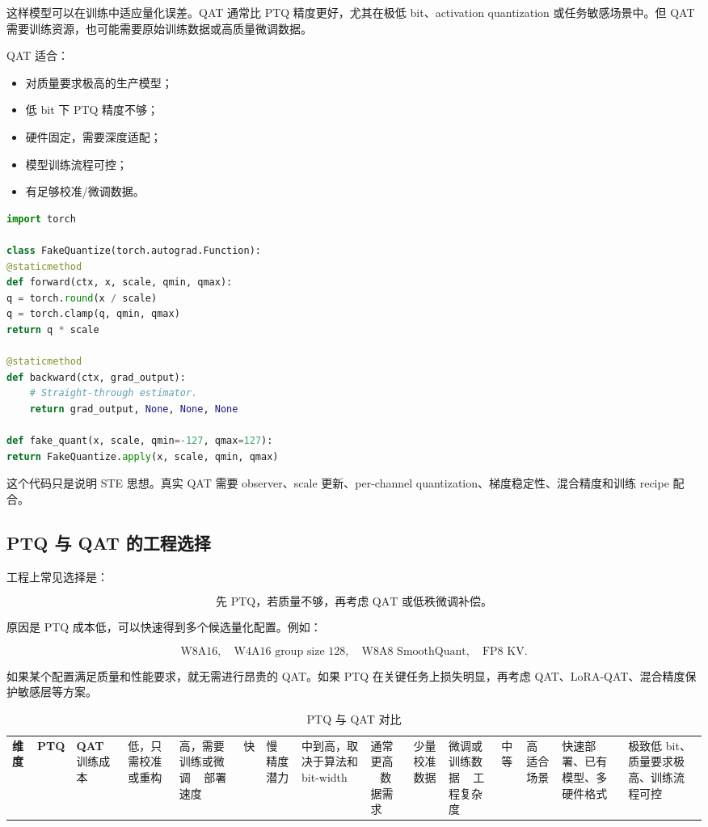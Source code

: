 这样模型可以在训练中适应量化误差。QAT 通常比 PTQ 精度更好，尤其在极低 bit、activation quantization 或任务敏感场景中。但 QAT 需要训练资源，也可能需要原始训练数据或高质量微调数据。

QAT 适合：

\begin{itemize}
\item 对质量要求极高的生产模型；
\item 低 bit 下 PTQ 精度不够；
\item 硬件固定，需要深度适配；
\item 模型训练流程可控；
\item 有足够校准/微调数据。
\end{itemize}

\begin{lstlisting}[language=Python,caption={Fake Quantization 的简化 PyTorch 实现},label={lst:fake-quantization-pytorch}]
import torch

class FakeQuantize(torch.autograd.Function):
@staticmethod
def forward(ctx, x, scale, qmin, qmax):
q = torch.round(x / scale)
q = torch.clamp(q, qmin, qmax)
return q * scale

@staticmethod
def backward(ctx, grad_output):
    # Straight-through estimator.
    return grad_output, None, None, None

def fake_quant(x, scale, qmin=-127, qmax=127):
return FakeQuantize.apply(x, scale, qmin, qmax)
\end{lstlisting}

这个代码只是说明 STE 思想。真实 QAT 需要 observer、scale 更新、per-channel quantization、梯度稳定性、混合精度和训练 recipe 配合。

\subsection{PTQ 与 QAT 的工程选择}
\label{subsec:ptq-vs-qat-engineering-choice}

工程上常见选择是：

\[
\text{先 PTQ，若质量不够，再考虑 QAT 或低秩微调补偿。}
\]

原因是 PTQ 成本低，可以快速得到多个候选量化配置。例如：

\[
\text{W8A16},\quad
\text{W4A16 group size 128},\quad
\text{W8A8 SmoothQuant},\quad
\text{FP8 KV}.
\]

如果某个配置满足质量和性能要求，就无需进行昂贵的 QAT。如果 PTQ 在关键任务上损失明显，再考虑 QAT、LoRA-QAT、混合精度保护敏感层等方案。

\begin{table}[H]
\centering
\small
\caption{PTQ 与 QAT 对比}
\label{tab:ptq-vs-qat}
\begin{tabular}{p{}p{}p{}}
\toprule
\textbf{维度} & \textbf{PTQ} & \textbf{QAT} \
\midrule
训练成本
& 低，只需校准或重构
& 高，需要训练或微调 \
\midrule
部署速度
& 快
& 慢 \
\midrule
精度潜力
& 中到高，取决于算法和 bit-width
& 通常更高 \
\midrule
数据需求
& 少量校准数据
& 微调或训练数据 \
\midrule
工程复杂度
& 中等
& 高 \
\midrule
适合场景
& 快速部署、已有模型、多硬件格式
& 极致低 bit、质量要求极高、训练流程可控 \
\bottomrule
\end{tabular}
\end{table}


